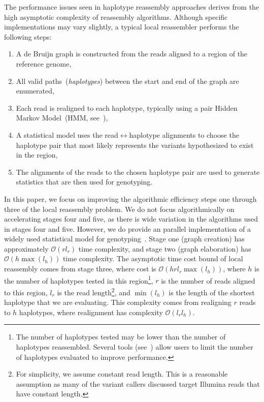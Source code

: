 \documentclass{bioinfo}
\begin{document}
The performance issues seen in haplotype reassembly approaches derives from the high asymptotic
complexity of reassembly algorithms. Although specific implementations may vary slightly, a typical
local reassembler performs the following steps:

\begin{enumerate}
\item A de Bruijn graph is constructed from the reads aligned to a region of the reference genome,
\item All valid paths~(\emph{haplotypes}) between the start and end of the graph are enumerated,
\item Each read is realigned to each haplotype, typically using a pair Hidden Markov Model~(HMM,
see~\citet{durbin98}),
\item A statistical model uses the read$\leftrightarrow$haplotype alignments to choose the haplotype pair
that most likely represents the variants hypothesized to exist in the region, 
\item The alignments of the reads to the chosen haplotype pair are used to generate statistics that are
then used for genotyping.
\end{enumerate}

In this paper, we focus on improving the algorithmic efficiency steps one through three of the local reassembly problem.
We do not focus algorithmically on accelerating stages four and five, as there is wide
variation in the algorithms used in stages four and five. However, we do provide an parallel
implementation of a widely used statistical model for genotyping~\citep{li11}. Stage one (graph
creation) has approximately $\mathcal{O}(r l_r)$ time complexity, and stage two (graph elaboration) has
$\mathcal{O}(h \max(l_h))$ time complexity.
The asymptotic time cost bound of local reassembly comes from stage three, where cost is $\mathcal{O}(h r l_r
\max(l_h))$, where $h$ is the number of haplotypes tested in this region\footnote{The number of
haplotypes tested may be lower than the number of haplotypes reassembled. Several tools
(see~\citet{depristo11, garrison12}) allow users to limit the number of haplotypes evaluated to improve
performance.}, $r$ is the number of reads aligned to this region, $l_r$ is the read length\footnote{For
simplicity, we assume constant read length. This is a reasonable assumption as many of the variant
callers discussed target Illumina reads that have constant length.}, and $\min(l_h)$ is the length of the
shortest haplotype that we are evaluating. This complexity comes from realigning $r$ reads to $h$
haplotypes, where realignment has complexity $\mathcal{O}(l_r l_h)$.
\end{document}
